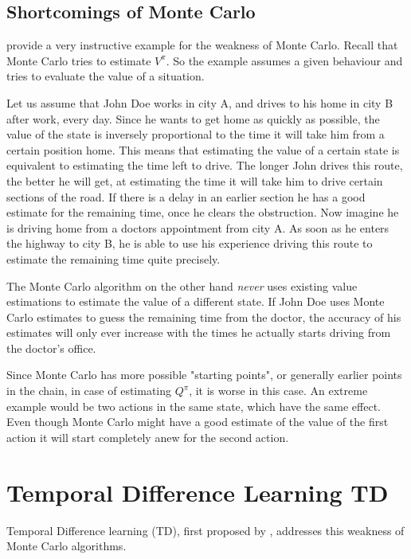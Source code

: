 \subsection{Shortcomings of Monte Carlo}
\citeauthor{suttonReinforcementLearningIntroduction1998} provide a very instructive example for the weakness of Monte Carlo. Recall that Monte Carlo tries to estimate \(V^\pi\). So the example assumes a given behaviour and tries to evaluate the value of a situation.

\begin{example}\label{driving home}
	Let us assume that John Doe works in city A, and drives to his home in city B after work, every day. Since he wants to get home as quickly as possible, the value of the state is inversely proportional to the time it will take him from a certain position home. This means that estimating the value of a certain state is equivalent to estimating the time left to drive. The longer John drives this route, the better he will get, at estimating the time it will take him to drive certain sections of the road. If there is a delay in an earlier section he has a good estimate for the remaining time, once he clears the obstruction. Now imagine he is driving home from a doctors appointment from city A. As soon as he enters the highway to city B, he is able to use his experience driving this route to estimate the remaining time quite precisely.

	The Monte Carlo algorithm on the other hand \emph{never} uses existing value estimations to estimate the value of a different state. If John Doe uses Monte Carlo estimates to guess the remaining time from the doctor, the accuracy of his estimates will only ever increase with the times he actually starts driving from the doctor's office. 
\end{example}

Since Monte Carlo has more possible "starting points", or generally earlier points in the chain, in case of estimating \(Q^\pi\), it is worse in this case. An extreme example would be two actions in the same state, which have the same effect. Even though Monte Carlo might have a good estimate of the value of the first action it will start completely anew for the second action. 

\section{Temporal Difference Learning TD}
Temporal Difference learning (TD), first proposed by \textcite{suttonLearningPredictMethods1988}, addresses this weakness of Monte Carlo algorithms. 

